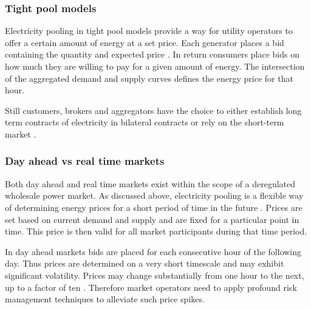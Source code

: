 \subsubsection{Tight pool models}

Electricity pooling in tight pool models provide a way for utility operators to offer a certain amount of energy at a set price. Each generator places a bid containing the quantity and expected price \cite{barroso2005classification}. In return consumers place bids on how much they are willing to pay for a given amount of energy. The intersection of the aggregated demand and supply curves defines the energy price for that hour. 

Still customers, brokers and aggregators have the choice to either establish long term contracts of electricity in bilateral contracts or rely on the short-term market \cite{hogan1997reshaping}.







\subsubsection{Day ahead vs real time markets}

Both day ahead and real time markets exist within the scope of a deregulated wholesale power market. As discussed above, electricity pooling is a flexible way of determining energy prices for a short period of time in the future \cite{hogan1997reshaping}. Prices are set based on current demand and supply and are fixed for a particular point in time. This price is then valid for all market participants during that time period. 

In day ahead markets bids are placed for each consecutive hour of the following day. Thus prices are determined on a very short timescale and may exhibit significant volatility. Prices may change substantially from one hour to the next, up to a factor of ten \cite{huisman2007hourly}. Therefore market operators need to apply profound risk management techniques to alleviate such price spikes. 

